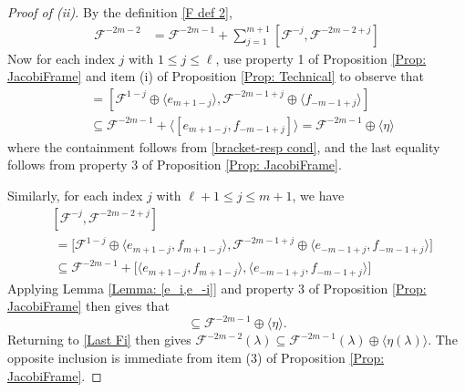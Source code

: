 \documentclass[11pt,letterpaper]{amsart}
\numberwithin{equation}{section}
\begin{document}
\begin{proof}[Proof of (ii)]
    By the definition \eqref{F def 2},
    \begin{align}
        \label{Last Fi}
        \mathcal{F}^{-2m-2} & = \mathcal{F}^{-2m-1} + \sum_{j=1}^{m+1}[\mathcal{F}^{-j},\mathcal{F}^{-2m-2+j}]
    \end{align}
    Now for each index $j$ with $1\leq j \leq \ell$, use property 1 of Proposition \ref{Prop: JacobiFrame} and item (i) of Proposition \ref{Prop: Technical} to observe that 
    \begin{align}
        [\mathcal{F}^{-j},\mathcal{F}^{-2m-2+j}] & =[\mathcal{F}^{1-j}\oplus \langle e_{m+1-j}\rangle,\mathcal{F}^{-2m-1+j}\oplus \langle f_{-m-1+j}\rangle]
        \\
        &\subseteq \mathcal{F}^{-2m-1} + \Big\langle [e_{m+1-j},f_{-m-1+j}]\Big\rangle = \mathcal{F}^{-2m-1}\oplus \langle \eta\rangle
    \end{align}
    where the containment follows from \eqref{bracket-resp cond}, and the last equality follows from property 3 of Proposition \ref{Prop: JacobiFrame}. 
    
    Similarly, for each index $j$ with $\ell+1\leq j \leq m+1$, we have
    \begin{align}
        &[\mathcal{F}^{-j},\mathcal{F}^{-2m-2+j}]
        \\
        &\ = \big[\mathcal{F}^{1-j}\oplus \langle e_{m+1-j},f_{m+1-j}\rangle,\mathcal{F}^{-2m-1+j}\oplus \langle e_{-m-1+j}, f_{-m-1+j}\rangle\big]
        \\
        &\ \subseteq \mathcal{F}^{-2m-1} + \big[\langle e_{m+1-j},f_{m+1-j}\rangle,\langle e_{-m-1+j},f_{-m-1+j}\rangle\big]
    \end{align}
    Applying Lemma \ref{Lemma: [e_i,e_-i]} and property 3 of Proposition \ref{Prop: JacobiFrame} then gives that 
    \begin{equation}
        [\mathcal{F}^{-j},\mathcal{F}^{-2m-2+j}]\subseteq \mathcal{F}^{-2m-1}\oplus \langle \eta\rangle.
    \end{equation}
    Returning to \eqref{Last Fi} then gives $\mathcal{F}^{-2m-2}(\lambda) \subseteq  \mathcal{F}^{-2m-1}(\lambda)\oplus \big\langle \eta(\lambda)\big\rangle$. The opposite inclusion is immediate from item (3) of Proposition \ref{Prop: JacobiFrame}.
\end{proof}
\end{document}
